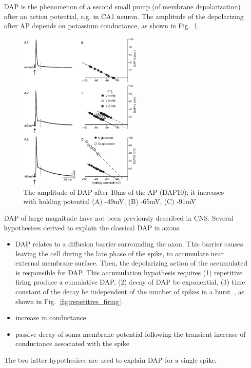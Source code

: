 DAP is the phenomenon of a second small pump (of membrane depolarization)
after an action potential, e.g. in CA1 neuron. The amplitude of the depolarizing
after AP depends on potassium conductance, as shown in Fig.~\ref{fig:DAP}.
\begin{figure}[hbt]
  \centerline{\includegraphics[height=8cm,
    angle=0]{./images/DAP.eps}}
\caption{The amplitude of DAP after 10ms of the AP (DAP10); it
  increases with holding potential (A) -49mV, (B) -65mV, (C) -91mV}
\label{fig:DAP}
\end{figure}

DAP of large magnitude have not been previously described in
CNS. Several hypothesises derived to explain the classical DAP in
axons. 
\begin{itemize}
\item DAP relates to a diffusion barrier surrounding the axon. This
  barrier causes  leaving the cell during the late phase of the
  spike, to accumulate near external membrane surface. Then, the
  depolarizing action of the accumulated  is responsible for
  DAP. This accumulation hypothesis requires (1) repetitive firing
  produce a cumulative DAP, (2) decay of DAP be exponential, (3) time
  constant of the decay be independent of the number of spikes in a
  burst~\citep{kandel1961ehn_b}, as shown in
  Fig.~\ref{fig:repetitive_firing}.
\item increase in  conductance 
\item passive decay of soma membrane potential following the transient
  increase of conductance associated with the spike
\end{itemize}
The two latter hypothesises are used to explain DAP for a single
spike. 

